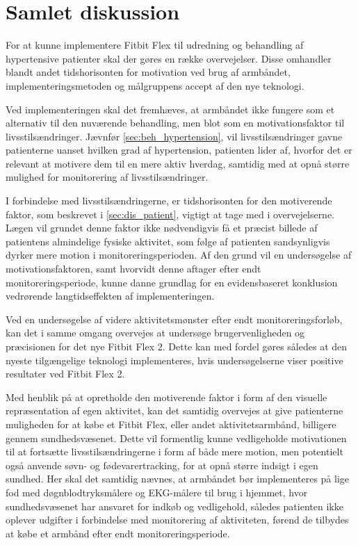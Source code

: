 \section{Samlet diskussion}

For at kunne implementere Fitbit Flex til udredning og behandling af hypertensive patienter skal der gøres en række overvejelser. Disse omhandler blandt andet tidshorisonten for motivation ved brug af armbåndet, implementeringsmetoden og målgruppens accept af den nye teknologi. 

Ved implementeringen skal det fremhæves, at armbåndet ikke fungere som et alternativ til den nuværende behandling, men blot som en motivationsfaktor til livsstilsændringer. Jævnfør \autoref{sec:beh_hypertension}, vil livsstilsændringer gavne patienterne uanset hvilken grad af hypertension, patienten lider af, hvorfor det er relevant at motivere dem til en mere aktiv hverdag, samtidig med at opnå større mulighed for monitorering af livsstilsændringer.

I forbindelse med livsstilsændringerne, er tidshorisonten for den motiverende faktor, som beskrevet i \autoref{sec:dis_patient}, vigtigt at tage med i overvejelserne. Lægen vil grundet denne faktor ikke nødvendigvis få et præcist billede af patientens almindelige fysiske aktivitet, som følge af patienten sandsynligvis dyrker mere motion i monitoreringsperioden. Af den grund vil en undersøgelse af motivationsfaktoren, samt hvorvidt denne aftager efter endt monitoreringsperiode, kunne danne grundlag for en evidensbaseret konklusion vedrørende langtidseffekten af implementeringen.

Ved en undersøgelse af videre aktivitetsmønster efter endt monitoreringsforløb, kan det i samme omgang overvejes at undersøge brugervenligheden og præcisionen for det nye Fitbit Flex 2. Dette kan med fordel gøres således at den nyeste tilgængelige teknologi implementeres, hvis undersøgelserne viser positive resultater ved Fitbit Flex 2.

Med henblik på at opretholde den motiverende faktor i form af den visuelle repræsentation af egen aktivitet, kan det samtidig overvejes at give patienterne muligheden for at købe et Fitbit Flex, eller andet aktivitetsarmbånd, billigere gennem sundhedsvæsenet. Dette vil formentlig kunne vedligeholde motivationen til at fortsætte livsstilsændringerne i form af både mere motion, men potentielt også anvende søvn- og fødevarertracking, for at opnå større indsigt i egen sundhed. Her skal det samtidig nævnes, at armbåndet bør implementeres på lige fod med døgnblodtryksmålere og EKG-målere til brug i hjemmet, hvor sundhedsvæsenet har ansvaret for indkøb og vedligehold, således patienten ikke oplever udgifter i forbindelse med monitorering af aktiviteten, førend de tilbydes at købe et armbånd efter endt monitoreringsperiode.